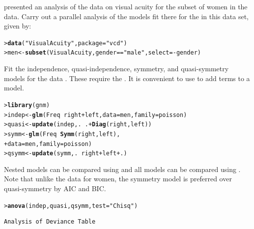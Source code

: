 \documentclass[10pt]{report}\usepackage[]{graphicx}\usepackage[]{color}
\makeatletter
\newcommand{\hlstr}[1]{\textcolor[rgb]{0.192,0.494,0.8}{#1}}%
\newcommand{\hlopt}[1]{\textcolor[rgb]{0,0,0}{#1}}%
\newcommand{\hlstd}[1]{\textcolor[rgb]{0.345,0.345,0.345}{#1}}%
\newcommand{\hlkwb}[1]{\textcolor[rgb]{0.69,0.353,0.396}{#1}}%
\newcommand{\hlkwc}[1]{\textcolor[rgb]{0.333,0.667,0.333}{#1}}%
\newcommand{\hlkwd}[1]{\textcolor[rgb]{0.737,0.353,0.396}{\textbf{#1}}}%
\newenvironment{kframe}{%
 \def\at@end@of@kframe{}%
 \ifinner\ifhmode%
  \def\at@end@of@kframe{\end{minipage}}%
  \begin{minipage}{\columnwidth}%
 \fi\fi%
 \def\FrameCommand##1{\hskip\@totalleftmargin \hskip-\fboxsep
 \colorbox{shadecolor}{##1}\hskip-\fboxsep
     \hskip-\linewidth \hskip-\@totalleftmargin \hskip\columnwidth}%
 \MakeFramed {\advance\hsize-\width
   \@totalleftmargin\z@ \linewidth\hsize
   \@setminipage}}%
 {\par\unskip\endMakeFramed%
 \at@end@of@kframe}
\newenvironment{knitrout}{}{} %
\renewenvironment{knitrout}{\small\renewcommand{\baselinestretch}{.85}}{} %
\makeatother
\begin{document}
\begin{Exercises}

  \exercise {} presented an analysis of the data on visual acuity 
  for the subset of women in the  data.  Carry out a parallel
  analysis of the models fit there for the  in this data set, given by:
\begin{knitrout}\footnotesize
{}\color{fgcolor}\begin{kframe}
\begin{alltt}
\hlstd{> }\hlkwd{data}\hlstd{(}\hlstr{"VisualAcuity"}\hlstd{,} \hlkwc{package}\hlstd{=}\hlstr{"vcd"}\hlstd{)}
\hlstd{> }\hlstd{men} \hlkwb{<-} \hlkwd{subset}\hlstd{(VisualAcuity, gender}\hlopt{==}\hlstr{"male"}\hlstd{,} \hlkwc{select}\hlstd{=}\hlopt{-}\hlstd{gender)}
\end{alltt}
\end{kframe}
\end{knitrout}
	\begin{ans}
	Fit the independence, quasi-independence, symmetry, and quasi-symmetry models for the data .
	These require the . It is convenient to use  to add terms to a model.
\begin{knitrout}\footnotesize
{}\color{fgcolor}\begin{kframe}
\begin{alltt}
\hlstd{> }\hlkwd{library}\hlstd{(gnm)}
\hlstd{> }\hlstd{indep} \hlkwb{<-} \hlkwd{glm}\hlstd{(Freq} \hlopt{~} \hlstd{right} \hlopt{+} \hlstd{left,}  \hlkwc{data} \hlstd{= men,} \hlkwc{family}\hlstd{=poisson)}
\hlstd{> }\hlstd{quasi} \hlkwb{<-} \hlkwd{update}\hlstd{(indep, .} \hlopt{~} \hlstd{.} \hlopt{+} \hlkwd{Diag}\hlstd{(right, left))}
\hlstd{> }\hlstd{symm} \hlkwb{<-} \hlkwd{glm}\hlstd{(Freq} \hlopt{~} \hlkwd{Symm}\hlstd{(right, left),}
\hlstd{+ }       \hlkwc{data} \hlstd{= men,} \hlkwc{family} \hlstd{= poisson)}
\hlstd{> }\hlstd{qsymm} \hlkwb{<-} \hlkwd{update}\hlstd{(symm, .} \hlopt{~} \hlstd{right} \hlopt{+} \hlstd{left} \hlopt{+} \hlstd{.)}
\end{alltt}
\end{kframe}
\end{knitrout}
  Nested models can be compared using  and all models can be compared using .
  Note that unlike the data for women, the symmetry model is preferred over quasi-symmetry by AIC and BIC.
\begin{knitrout}\footnotesize
{}\color{fgcolor}\begin{kframe}
\begin{alltt}
\hlstd{> }\hlkwd{anova}\hlstd{(indep, quasi, qsymm,} \hlkwc{test}\hlstd{=}\hlstr{"Chisq"}\hlstd{)}
\end{alltt}
\begin{verbatim}
Analysis of Deviance Table


\end{verbatim}
\end{kframe}
\end{knitrout}
\end{ans}
\end{Exercises}
\end{document}
